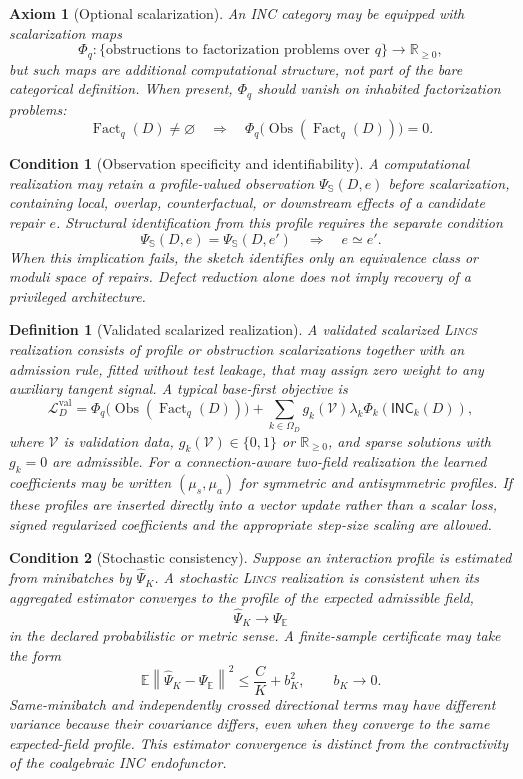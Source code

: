 \documentclass{article}
\newtheorem{definition}{Definition}
\newtheorem{axiom}{Axiom}
\newtheorem{condition}{Condition}
\newcommand{\R}{\mathbb{R}}
\newcommand{\INC}{\mathsf{INC}}
\newcommand{\Loss}{\mathcal{L}}
\newcommand{\Fact}{\operatorname{Fact}}
\newcommand{\Obs}{\operatorname{Obs}}
\newcommand{\norm}[1]{\left\lVert #1 \right\rVert}
\begin{document}
\begin{axiom}[Optional scalarization]
An INC category may be equipped with scalarization maps
\[
\Phi_q:\{\text{obstructions to factorization problems over }q\}\to\R_{\ge 0},
\]
but such maps are additional computational structure, not part of the bare categorical definition. When present, \(\Phi_q\) should vanish on inhabited factorization problems:
\[
\Fact_q(D)\neq\varnothing
\quad\Rightarrow\quad
\Phi_q\big(\Obs(\Fact_q(D))\big)=0.
\]
\end{axiom}

\begin{condition}[Observation specificity and identifiability]
A computational realization may retain a profile-valued observation
$\Psi_{\mathbb S}(D,e)$ before scalarization, containing local, overlap,
counterfactual, or downstream effects of a candidate repair $e$.  Structural
identification from this profile requires the separate condition
\[
\Psi_{\mathbb S}(D,e)=\Psi_{\mathbb S}(D,e')
\quad\Longrightarrow\quad
e\simeq e'.
\]
When this implication fails, the sketch identifies only an equivalence class
or moduli space of repairs.  Defect reduction alone does not imply recovery of
a privileged architecture.
\end{condition}

\begin{definition}[Validated scalarized realization]
A validated scalarized \textsc{Lincs} realization consists of profile or
obstruction scalarizations together with an admission rule, fitted without
test leakage, that may assign zero weight to any auxiliary tangent signal.  A
typical base-first objective is
\[
\Loss_D^{\mathrm{val}}
  =
  \Phi_q\big(\Obs(\Fact_q(D))\big)
  +
  \sum_{k\in\Omega_D}g_k(\mathcal V)\lambda_k\Phi_k(\INC_k(D)),
\]
where $\mathcal V$ is validation data, $g_k(\mathcal V)\in\{0,1\}$ or
$\mathbb R_{\geq0}$, and sparse solutions with $g_k=0$ are admissible.  For a
connection-aware two-field realization the learned coefficients may be
written $(\mu_s,\mu_a)$ for symmetric and antisymmetric profiles.  If these
profiles are inserted directly into a vector update rather than a scalar
loss, signed regularized coefficients and the appropriate step-size scaling
are allowed.
\end{definition}

\begin{condition}[Stochastic consistency]
Suppose an interaction profile is estimated from minibatches by
$\widehat\Psi_K$.  A stochastic \textsc{Lincs} realization is consistent when
its aggregated estimator converges to the profile of the expected admissible
field,
\[
\widehat\Psi_K
\longrightarrow
\Psi_{\mathbb E}
\]
in the declared probabilistic or metric sense.  A finite-sample certificate
may take the form
\[
\mathbb E\norm{\widehat\Psi_K-\Psi_{\mathbb E}}^2
\leq \frac{C}{K}+b_K^2,
\qquad b_K\to0.
\]
Same-minibatch and independently crossed directional terms may have different
variance because their covariance differs, even when they converge to the
same expected-field profile.  This estimator convergence is distinct from the
contractivity of the coalgebraic INC endofunctor.
\end{condition}
\end{document}
